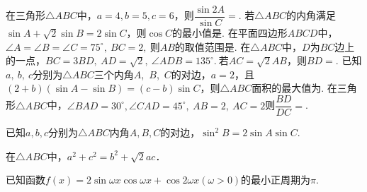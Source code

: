 \begin{questions}
\qs 在三角形$\triangle ABC$中，$ a=4,b=5,c=6 $，则$ \dfrac{\sin 2A}{\sin C}=$\tk.
\qs 若$\triangle ABC$的内角满足$ \sin A+\sqrt{2}\sin B=2\sin C $，则$ \cos C $的最小值是\tk.
\question 在平面四边形$ABCD$中，$\angle A=\angle B=\angle C=75^{\circ},\ $$ BC=2,\  $则$AB$的取值范围是\tk.
\qs 在$\triangle ABC$中，$ D $为$ BC $边上的一点，$ BC=3BD,\ AD=\sqrt{2},\ \angle ADB=135^{\circ}.\  $若$ AC=\sqrt{2}AB $，则$ BD= $\tk.
\question 已知$a,\ b,\ c$分别为$\triangle ABC$三个内角$A$,\ $B$,\ $C$的对边，$a=2$，且$(2+b)(\sin A-\sin B)=(c-b)\sin C$，则$\triangle ABC$面积的最大值为\tk.
\qs 在三角形$\triangle ABC$中，$ \angle BAD=30^{\circ},\angle CAD=45^{\circ},\ AB=2,\ AC=2 $则$ \dfrac{BD}{DC}= $\tk.
\vspace{-2em}
\begin{center}
\end{center} 



\qs 已知$a,b,c$分别为$\triangle ABC$内角$A,B,C$的对边，$\sin^2B=2\sin A\sin C$.
\kongbai
\qs 在$ \triangle ABC $中，$ a^2+c^2=b^2+\sqrt{2}ac $．
\newpage
\qs 已知函数$f(x)=2\sin \omega x\cos \omega x+\cos 2\omega x (\omega >0) $的最小正周期为$ \pi $.
\begin{parts}

\end{parts}
\end{questions}
